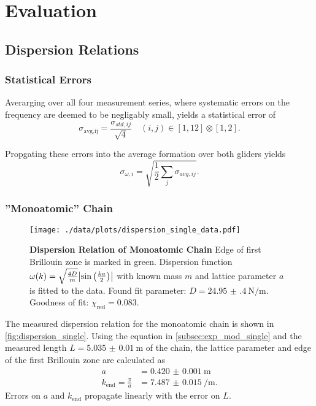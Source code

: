 \chapter{Evaluation}

\section{Dispersion Relations}\label{sec:disp_rels}
\subsection{Statistical Errors}
Averarging over all four measurement series, where systematic errors on the frequency are deemed to be negligably small, yields a statistical error of
\begin{equation*}
	\sigma_\text{avg,ij} = \frac{\sigma_{std,ij}}{\sqrt{4}}\quad (i,j)\in[1, 12]\otimes[1,2].
\end{equation*}

Propgating these errors into the average formation over both gliders yields
\begin{equation*}
	\sigma_{\omega,i} = \sqrt{\frac{1}{2}\sum_{j}\sigma_{avg,ij}}.
\end{equation*}

\subsection{''Monoatomic'' Chain}\label{subsec:disp_mono}
\begin{figure}
	\centering
	\texttt{[image: ./data/plots/dispersion\_single\_data.pdf]}
	\caption[Dispersion Relation of Monoatomic Chain]{\textbf{Dispersion Relation of Monoatomic Chain} Edge of first Brillouin zone is marked in green.
	Dispersion function $\omega(k) = \sqrt{\frac{4D}{m}}\abs{\sin\left(\frac{ka}{2}\right)}$ with known mass $m$ and lattice parameter $a$ is fitted to the data.
	Found fit parameter: $D=\SI{24.95(40)}{\newton\per\meter}$. Goodness of fit: $\chi_\text{red}=\num{0.083}$.}
	\label{fig:dispersion_single}
\end{figure}
The measured dispersion relation for the monoatomic chain is shown in \autoref{fig:dispersion_single}.
Using the equation in \autoref{subsec:exp_mod_single} and the measured length $L=\SI{5.035(10)}{\meter}$ of the chain, the lattice parameter and edge of the first Brillouin zone are calculated as
\begin{align*}
	a &= \SI{0.420(1)}{\meter} \\
	k_\text{end} = \frac{\pi}{a} &= \SI{7.487(15)}{\per\meter}.
\end{align*}
Errors on $a$ and $k_\text{end}$ propagate linearly with the error on $L$.

